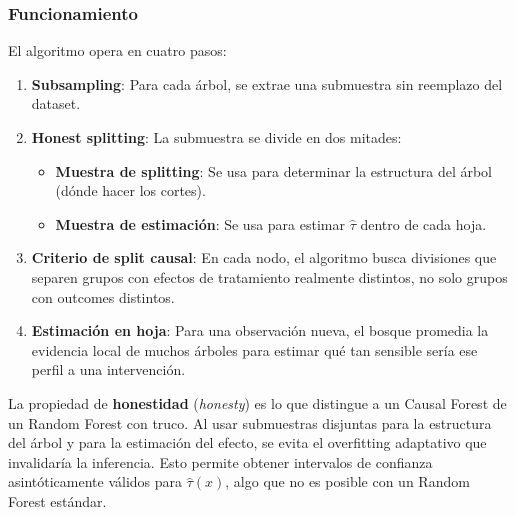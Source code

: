 \documentclass[
  spanish,
  11pt,
  letterpaper,
]{scrbook}
\providecommand{\tightlist}{%
  \setlength{\itemsep}{0pt}\setlength{\parskip}{0pt}}
\theoremstyle{plain}
\theoremstyle{remark}
\begin{document}
\subsubsection{Funcionamiento}\label{funcionamiento}

El algoritmo opera en cuatro pasos:

\begin{enumerate}
\def\labelenumi{\arabic{enumi}.}
\item
  \textbf{Subsampling}: Para cada árbol, se extrae una submuestra sin
  reemplazo del dataset.
\item
  \textbf{Honest splitting}: La submuestra se divide en dos mitades:

  \begin{itemize}
  \tightlist
  \item
    \textbf{Muestra de splitting}: Se usa para determinar la estructura
    del árbol (dónde hacer los cortes).
  \item
    \textbf{Muestra de estimación}: Se usa para estimar \(\hat{\tau}\)
    dentro de cada hoja.
  \end{itemize}
\item
  \textbf{Criterio de split causal}: En cada nodo, el algoritmo busca
  divisiones que separen grupos con efectos de tratamiento realmente
  distintos, no solo grupos con outcomes distintos.
\item
  \textbf{Estimación en hoja}: Para una observación nueva, el bosque
  promedia la evidencia local de muchos árboles para estimar qué tan
  sensible sería ese perfil a una intervención.
\end{enumerate}

\begin{tcolorbox}[enhanced jigsaw, arc=.35mm, bottomrule=.15mm, bottomtitle=1mm, breakable, colback=white, colbacktitle=quarto-callout-note-color!10!white, colframe=quarto-callout-note-color-frame, coltitle=black, left=2mm, leftrule=.75mm, opacityback=0, opacitybacktitle=0.6, rightrule=.15mm, title=\textcolor{quarto-callout-note-color}{\faInfo}\hspace{0.5em}{Honestidad y validez inferencial}, titlerule=0mm, toprule=.15mm, toptitle=1mm]

La propiedad de \textbf{honestidad} (\emph{honesty}) es lo que distingue
a un Causal Forest de un Random Forest con truco. Al usar submuestras
disjuntas para la estructura del árbol y para la estimación del efecto,
se evita el overfitting adaptativo que invalidaría la inferencia. Esto
permite obtener intervalos de confianza asintóticamente válidos para
\(\hat{\tau}(x)\), algo que no es posible con un Random Forest estándar.

\end{tcolorbox}
\end{document}
